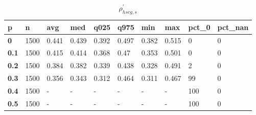 \begin{table}[h]
 \centering 
\footnotesize
\caption{$\rho_{hscg,s}^\prime $}
\label{tab:alphahscgs}
\begin{tabular}[h]{|l|l|l|l|l|l|l|l|l|l|
    } \hline
\textbf{ p} & \textbf{ n} & \textbf{ avg} & \textbf{ med} & \textbf{ q025} & \textbf{ q975} & \textbf{ min} & \textbf{ max} & \textbf{ pct\_0} & \textbf{ pct\_nan}
    \\ \hline
  \textbf{  0} & 1500 & 0.441 & 0.439 & 0.392 & 0.497 & 0.382 & 0.515 &   0 & 0
    \\ \hline
  \textbf{0.1} & 1500 & 0.415 & 0.414 & 0.368 &  0.47 & 0.353 & 0.501 &   0 & 0
    \\ \hline
  \textbf{0.2} & 1500 & 0.384 & 0.382 & 0.339 & 0.438 & 0.328 & 0.491 &   2 & 0
    \\ \hline
  \textbf{0.3} & 1500 & 0.356 & 0.343 & 0.312 & 0.464 & 0.311 & 0.467 &  99 & 0
    \\ \hline
  \textbf{0.4} & 1500 & - & - & - & - & - & - & 100 & 0
    \\ \hline
  \textbf{0.5} & 1500 & - & - & - & - & - & - & 100 & 0
    \\ \hline
 \end{tabular}
 \end{table}
